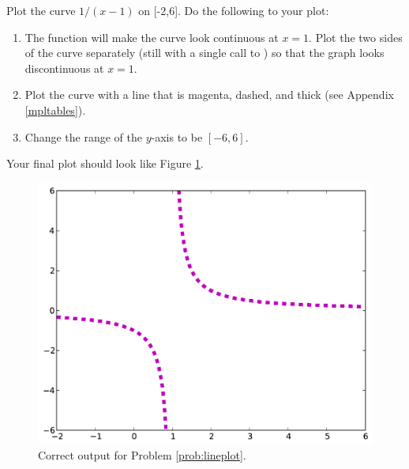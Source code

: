 	
\begin{problem}\label{prob:lineplot}
Plot the curve $1/(x-1)$ on [-2,6].
Do the following to your plot:

\begin{enumerate}
\item The function  will make the curve look continuous at $x=1$. 
Plot the two sides of the curve separately (still with a single call to ) so that the graph looks discontinuous at $x=1$.
\item Plot the curve with a line that is magenta, dashed, and thick (see Appendix \ref{mpltables}).
\item Change the range of the $y$-axis to be $[-6, 6]$.
\end{enumerate}
Your final plot should look like Figure \ref{fig:problem2}.

\begin{figure}[H]
\includegraphics[width=.7\textwidth]{soln2.pdf}
\caption{Correct output for Problem \ref{prob:lineplot}.}
\label{fig:problem2}
\end{figure}
\end{problem}

